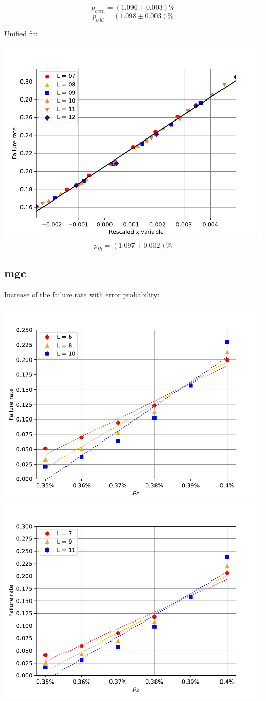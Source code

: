 \documentclass[pra]{revtex4-1}
\begin{document}
\[  p_{even} = (1.096 \pm 0.003)\% \]
\[  p_{odd} = (1.098 \pm 0.003)\% \]
\clearpage 

Unified fit: \begin{center} 

\includegraphics[width=.9\textwidth]{../graphs-paper2/mco-dephasing-rescaled.pdf}
\[  p_{th} = (1.097 \pm 0.002)\% \] \end{center}
\clearpage 

\subsection*{mgc}
\noindent Increase of the failure rate with error probability: 
  
\includegraphics[width=.49\textwidth]{../graphs-paper2/mgc-dephasing-even.pdf}
\includegraphics[width=.49\textwidth]{../graphs-paper2/mgc-dephasing-odd.pdf}
\end{document}
